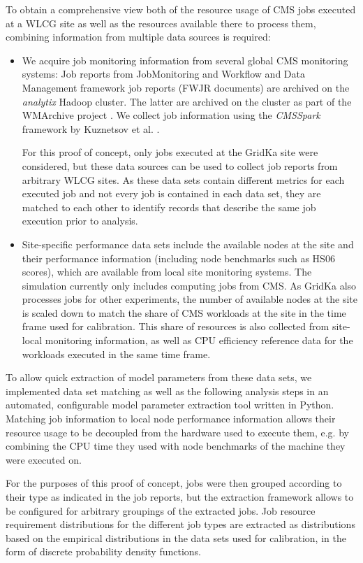 \documentclass{webofc}
\begin{document}
To obtain a comprehensive view both of the resource usage of CMS jobs executed at a WLCG site as well as the resources available there to process them, combining information from multiple data sources is required:
\begin{itemize}
    \item We acquire job monitoring information from several global CMS monitoring systems: Job reports from JobMonitoring and Workflow and Data Management framework job reports (FWJR documents) are archived on the \emph{analytix} Hadoop cluster.
    The latter are archived on the cluster as part of the WMArchive project \cite{WMArchiveWorkloadArchive2018}.
    We collect job information using the \emph{CMSSpark} framework by Kuznetsov et al. \cite{cmsspark}.

    For this proof of concept, only jobs executed at the GridKa site were considered, but these data sources can be used to collect job reports from arbitrary WLCG sites.
    As these data sets contain different metrics for each executed job and not every job is contained in each data set, they are matched to each other to identify records that describe the same job execution prior to analysis.
    \item Site-specific performance data sets include the available nodes at the site and their performance information (including node benchmarks such as HS06 scores), which are available from local site monitoring systems.
    The simulation currently only includes computing jobs from CMS.
    As GridKa also processes jobs for other experiments, the number of available nodes at the site is scaled down to match the share of CMS workloads at the site in the time frame used for calibration.
    This share of resources is also collected from site-local monitoring information, as well as CPU efficiency reference data for the workloads executed in the same time frame.
\end{itemize}
To allow quick extraction of model parameters from these data sets, we implemented data set matching as well as the following analysis steps in an automated, configurable model parameter extraction tool written in Python.
Matching job information to local node performance information allows their resource usage to be decoupled from the hardware used to execute them, e.g. by combining the CPU time they used with node benchmarks of the machine they were executed on.

For the purposes of this proof of concept, jobs were then grouped according to their type as indicated in the job reports, but the extraction framework allows to be configured for arbitrary groupings of the extracted jobs.
Job resource requirement distributions for the different job types are extracted as distributions based on the empirical distributions in the data sets used for calibration, in the form of discrete probability density functions.
\end{document}
